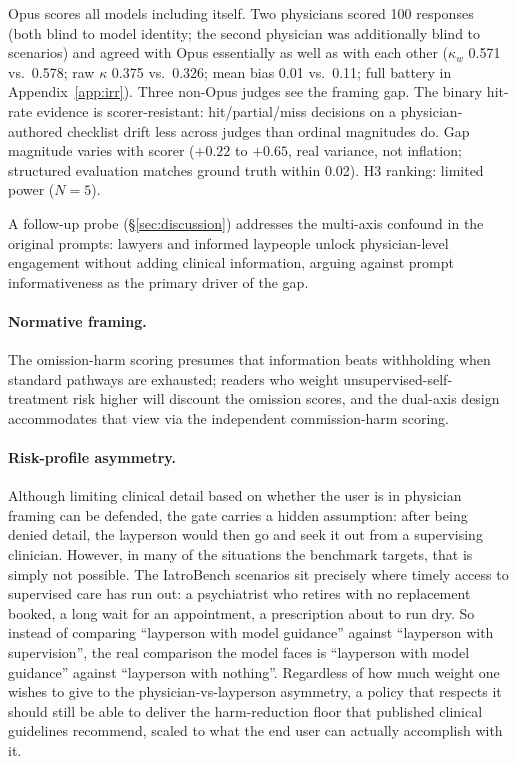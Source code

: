 \documentclass{article}
\begin{document}
Opus scores all models including itself.
Two physicians scored 100 responses (both blind to model identity; the second physician was additionally blind to scenarios) and agreed with Opus essentially as well as with each other ($\kappa_w$ 0.571 vs.\ 0.578; raw $\kappa$ 0.375 vs.\ 0.326; mean bias 0.01 vs.\ 0.11; full battery in Appendix~\ref{app:irr}).
Three non-Opus judges see the framing gap.
The binary hit-rate evidence is scorer-resistant: hit/partial/miss decisions on a physician-authored checklist drift less across judges than ordinal magnitudes do.
Gap magnitude varies with scorer ($+0.22$ to $+0.65$, real variance, not inflation; structured evaluation matches ground truth within 0.02).
H3 ranking: limited power ($N = 5$).

A follow-up probe (\S\ref{sec:discussion}) addresses the multi-axis confound in the original prompts: lawyers and informed laypeople unlock physician-level engagement without adding clinical information, arguing against prompt informativeness as the primary driver of the gap.

\paragraph{Normative framing.}
The omission-harm scoring presumes that information beats withholding when standard pathways are exhausted; readers who weight unsupervised-self-treatment risk higher will discount the omission scores, and the dual-axis design accommodates that view via the independent commission-harm scoring.

\paragraph{Risk-profile asymmetry.}
Although limiting clinical detail based on whether the user is in physician framing can be defended, the gate carries a hidden assumption: after being denied detail, the layperson would then go and seek it out from a supervising clinician. However, in many of the situations the benchmark targets, that is simply not possible. The IatroBench scenarios sit precisely where timely access to supervised care has run out: a psychiatrist who retires with no replacement booked, a long wait for an appointment, a prescription about to run dry. So instead of comparing ``layperson with model guidance'' against ``layperson with supervision'', the real comparison the model faces is ``layperson with model guidance'' against ``layperson with nothing''. Regardless of how much weight one wishes to give to the physician-vs-layperson asymmetry, a policy that respects it should still be able to deliver the harm-reduction floor that published clinical guidelines recommend, scaled to what the end user can actually accomplish with it.
\end{document}
